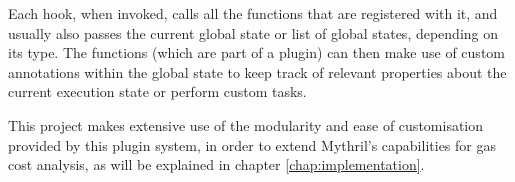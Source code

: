 Each hook, when invoked, calls all the functions that are registered with it, and usually also passes
the current global state or list of global states, depending on its type. The functions (which are part
of a plugin) can then make use of custom annotations within the global state to keep track of relevant properties
about the current execution state or perform custom tasks.

This project makes extensive use of the modularity and ease of customisation provided by this plugin system,
in order to extend Mythril's capabilities for gas cost analysis, as will be explained in chapter \ref{chap:implementation}.

